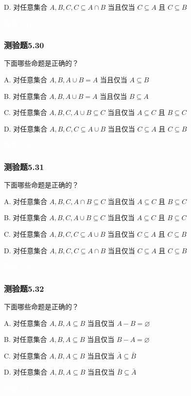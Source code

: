 \documentclass[UTF8, heading=true]{ctexart}
\begin{document}
D. 对任意集合 $A, B, C, C \subseteq A \cap B$ 当且仅当 $C \subseteq A$ 且 $C \subseteq B$

\textcolor{white}{答案：AD}

\subsubsection{测验题5.30}
下面哪些命题是正确的？

A. 对任意集合 $A, B, A \cup B=A$ 当且仅当 $A \subseteq B$

B. 
对任意集合 $A, B, A \cup B=A$ 当且仅当 $B \subseteq A$

C. 
对任意集合 $A, B, C, A \cup B \subseteq C$ 当且仅当 $A \subseteq C$ 且 $B \subseteq C$

D. 
对任意集合 $A, B, C, C \subseteq A \cup B$ 当且仅当 $C \subseteq A$ 且 $C \subseteq B$

\textcolor{white}{答案：BC}

\subsubsection{测验题5.31}

下面哪些命题是正确的？

A. 对任意集合 $A, B, C, A \cap B \subseteq C$ 当且仅当 $A \subseteq C$ 且 $B \subseteq C$

B. 对任意集合 $A, B, C, A \cup B \subseteq C$ 当且仅当 $A \subseteq C$ 且 $B \subseteq C$

C. 对任意集合 $A, B, C, C \subseteq A \cup B$ 当且仅当 $C \subseteq A$ 且 $C \subseteq B$

D. 对任意集合 $A, B, C, C \subseteq A \cap B$ 当且仅当 $C \subseteq A$ 且 $C \subseteq B$

\textcolor{white}{答案：BD}

\subsubsection{测验题5.32}
下面哪些命题是正确的？

A. 
对任意集合 $A, B, A \subseteq B$ 当且仅当 $A-B=\varnothing$

B. 
对任意集合 $A, B, A \subseteq B$ 当且仅当 $B-A=\varnothing$

C. 
对任意集合 $A, B, A \subseteq B$ 当且仅当 $\bar{A} \subseteq \bar{B}$

D. 
对任意集合 $A, B, A \subseteq B$ 当且仅当 $\bar{B} \subseteq \bar{A}$

\textcolor{white}{答案：AD}
\end{document}
